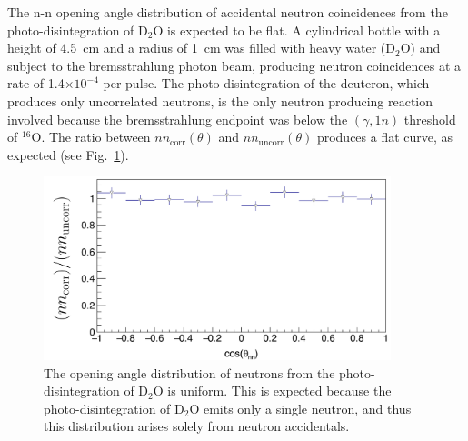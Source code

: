 The n-n opening angle distribution of accidental neutron coincidences from the photo-disintegration of D$_{2}$O is expected to be flat.
A cylindrical bottle with a height of 4.5~cm and a radius of 1~cm was filled with heavy water 
(D$_{2}$O) and subject to the bremsstrahlung photon beam, producing neutron coincidences at a rate of 1.4$\times10^{-4}$ per pulse.
The photo-disintegration of the deuteron, which produces only uncorrelated neutrons, is the only  neutron producing reaction involved because the bremsstrahlung endpoint was below the $(\gamma, 1n)$ threshold of $^{16}$O.
The ratio between $nn_{\text{corr}}(\theta)$ and $nn_{\text{uncorr}}(\theta)$ produces a flat curve, as expected (see Fig.~\ref{fig:D2Otheta_nn}).
\begin{figure}[h]
\includegraphics[width=0.9\textwidth]{Content/Methods/D2Otheta_nn.png}
\caption{The opening angle distribution of neutrons from the photo-disintegration of D$_{2}$O is uniform.
This is expected because the photo-disintegration of D$_{2}$O emits only a single neutron, and thus this distribution arises solely from neutron accidentals.}
\label{fig:D2Otheta_nn}
\end{figure}

\FloatBarrier
